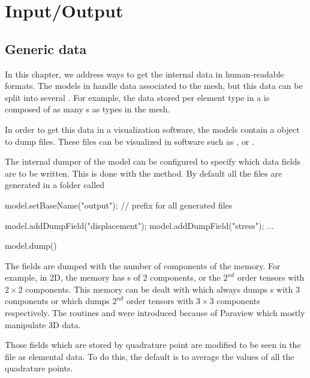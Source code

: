 
\chapter{Input/Output}

\section{Generic data}
In this chapter, we address ways to get the internal data in human-readable formats.
The models in \akantu handle data associated to the
mesh, but this data can be split into several . For example, the
data stored per element type in a  is composed of as
many s as types in the mesh.

In order to get this data in a visualization software, the models contain a
object to dump  files. These files can be visualized in software such
as \cite{paraview}, \cite{visit} or \cite{mayavi}.

The internal dumper of the model can be configured to specify which data fields
are to be written. This is done with the
 method. By default all the files
are generated in a folder called 

\begin{cpp}
  model.setBaseName("output"); // prefix for all generated files

  model.addDumpField("displacement");
  model.addDumpField("stress");
  ...

  model.dump()
\end{cpp}

The fields are dumped with the number of components of the memory. For example, in 2D, the memory has 
s of 2 components, or the $2^{nd}$ order tensors with $2\times2$ components.  
This memory can be dealt with  which always dumps
s with 3 components or  which dumps $2^{nd}$
order tensors with $3\times3$ components respectively. The routines  and
 were introduced because of Paraview which mostly manipulate 3D data.

Those fields which are stored by quadrature point are modified to be seen in the
 file as elemental data. To do this, the default is to average the
values of all the quadrature points.

